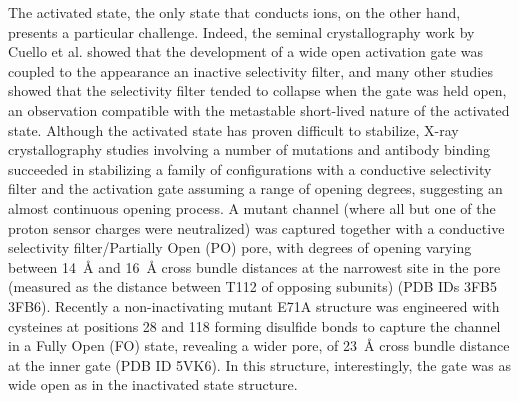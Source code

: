 \documentclass[%
 aip,
 amsmath,amssymb,
 preprint,%
]{revtex4-1}
\newcommand{\ca}{\ce{C_\alpha} }
\begin{document}
The activated state, the only state that conducts ions, on the other hand, presents a particular challenge. Indeed, the seminal crystallography work by Cuello et al. showed that the development of a wide open activation gate was coupled to the appearance an inactive selectivity filter, and many other studies showed that the selectivity filter tended to collapse when the gate was held open, an observation compatible with the metastable short-lived nature of the activated state.\cite{Cuello2010,Li2018,Furini2020} Although the activated state has proven difficult to stabilize, X-ray crystallography studies involving a number of mutations and antibody binding succeeded in stabilizing a family of configurations with a conductive selectivity filter and the activation gate assuming a range of opening degrees, suggesting an almost continuous opening process\cite{Cuello2010}. A mutant channel (where all but one of the proton sensor charges were neutralized) was captured together with a conductive selectivity filter/Partially Open (PO) pore, with degrees of opening varying between \SI{14}{\angstrom} and \SI{16}{\angstrom} cross bundle distances at the narrowest site in the pore (measured as the distance between T112 \ca of opposing subunits) (PDB IDs 3FB5 3FB6)\cite{Cuello2010}. Recently a non-inactivating mutant E71A structure was engineered with cysteines at positions 28 and 118 forming disulfide bonds to capture the channel in a Fully Open (FO) state, revealing a wider pore, of \SI{23}{\angstrom} cross bundle distance at the inner gate (PDB ID 5VK6). In this structure, interestingly, the gate was as wide open as in the inactivated state structure\cite{Cuello2017}.
 
\end{document}
